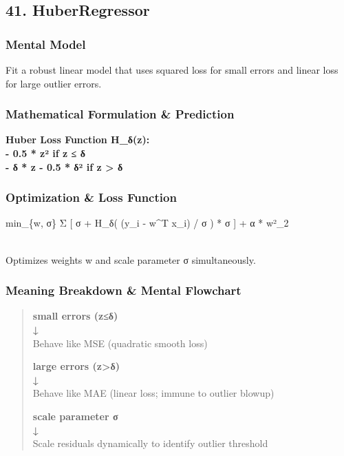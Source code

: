\documentclass[
  10pt,
  letterpaper,
]{article}
\begin{document}
\hypertarget{huberregressor}{%
\subsection{41. HuberRegressor}\label{huberregressor}}

\hypertarget{mental-model-40}{%
\subsubsection{Mental Model}\label{mental-model-40}}

Fit a robust linear model that uses squared loss for small errors and linear loss for large outlier errors.

\hypertarget{mathematical-formulation-prediction-40}{%
\subsubsection{Mathematical Formulation \& Prediction}\label{mathematical-formulation-prediction-40}}

\textbf{Huber Loss Function H\_δ(z):\\
- 0.5 * z² if \textbar z\textbar{} ≤ δ\\
- δ * \textbar z\textbar{} - 0.5 * δ² if \textbar z\textbar{} \textgreater{} δ}

\hypertarget{optimization-loss-function-40}{%
\subsubsection{Optimization \& Loss Function}\label{optimization-loss-function-40}}

min\_\{w, σ\} Σ {[} σ + H\_δ( (y\_i - w\^{}T x\_i) / σ ) * σ {]} + α * \textbar\textbar w\textbar\textbar²\_2\\
\strut \\
Optimizes weights w and scale parameter σ simultaneously.

\hypertarget{meaning-breakdown-mental-flowchart-40}{%
\subsubsection{Meaning Breakdown \& Mental Flowchart}\label{meaning-breakdown-mental-flowchart-40}}

\begin{quote}
\textbf{small errors (\textbar z\textbar≤δ)\\
↓\\
}Behave like MSE (quadratic smooth loss)

\textbf{large errors (\textbar z\textbar\textgreater δ)\\
↓\\
}Behave like MAE (linear loss; immune to outlier blowup)

\textbf{scale parameter σ\\
↓\\
}Scale residuals dynamically to identify outlier threshold
\end{quote}
\end{document}
